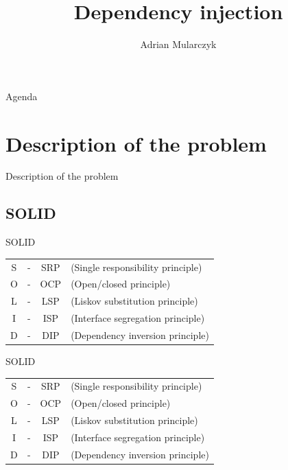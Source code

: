 \documentclass{beamer}
\title[]
{Dependency injection}
\author[Adrian Mularczyk]{Adrian Mularczyk}
\institute[PGS Softwarei]
{
PGS Software
}
\date{}
\begin{document}
\begin{frame}
  \titlepage 
\end{frame}

\begin{frame}{Agenda}
  \tableofcontents
\end{frame}

\section{Description of the problem}

\begin{frame}{}
\begin{center}
\Huge{Description of the problem}
\end{center}
\end{frame}

\subsection*{SOLID}

\begin{frame}{SOLID}
\begin{table}
	\Large{\begin{tabular}{ c c c l }
	S &-& SRP& (Single responsibility principle)\\
	O &-& OCP& (Open/closed principle)\\
	L &-& LSP& (Liskov substitution principle)\\
	I &-& ISP& (Interface segregation principle)\\
	D &-& DIP& (Dependency inversion principle)
	\end{tabular}}
\end{table}
\end{frame}

\begin{frame}{SOLID}
\begin{table}
	\Large{\begin{tabular}{ c c c l }
\color{gray} S &\color{gray}-& \color{gray}SRP& \color{gray}(Single responsibility principle)\\
\color{gray} O &\color{gray}-& \color{gray}OCP& \color{gray}(Open/closed principle)\\
\color{gray}	L &\color{gray}-& \color{gray}LSP& \color{gray}(Liskov substitution principle)\\
\color{gray}	I &\color{gray}-& \color{gray}ISP& \color{gray}(Interface segregation principle)\\
	D &-& DIP& (Dependency inversion principle)
	\end{tabular}}
\end{table}
\end{frame}
\end{document}
